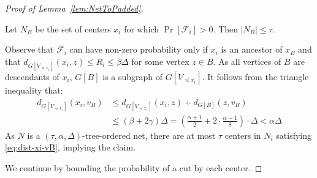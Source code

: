 \documentclass{theoretics}
\begin{document}
\begin{proof}[Proof of Lemma~\ref{lem:NetToPadded}]
	\begin{claim}\label{clm:NB-size} Let $N_B$ be the set of centers $x_i$ for which $\Pr[\mathcal{F}_i]>0$. Then $|N_B|\leq \tau$.
	\end{claim}
	\begin{subproof}
		Observe that $\mathcal{F}_i$ can have non-zero probability only if $x_i$ is an ancestor of $x_B$ and that $d_{G[V_{\preceq x_i}]}(x_{i},z) \leq R_i\leq \beta\Delta$ for some vertex $z\in B$. As  all vertices of $B$ are descendants of $x_i$,  $G[B]$ is a subgraph of $G[V_{\preceq x_i}]$. It follows from the triangle inequality that:
		\begin{align}
			d_{G[V_{\preceq x_{i}}]}(x_{i},v_{B}) & \leq d_{G[V_{\preceq x_{i}}]}(x_{i},z)+d_{G[B]}(z,v_{B})\nonumber \\
			& \leq(\beta+2\gamma)\Delta=\left(\frac{\alpha+1}{2}+2\cdot\frac{\alpha-1}{8}\right)\cdot\Delta<\alpha\Delta\label{eq:dist-xi-vB}
		\end{align}
		As $N$ is a $(\tau,\alpha,\Delta)$-tree-ordered net, there are at most $\tau$ centers in $N_i$ satisfying \cref{eq:dist-xi-vB}, implying the claim. 
	\end{subproof}	
	
	We continue by bounding the probability of a cut by each center.
	

\end{proof}
\end{document}
